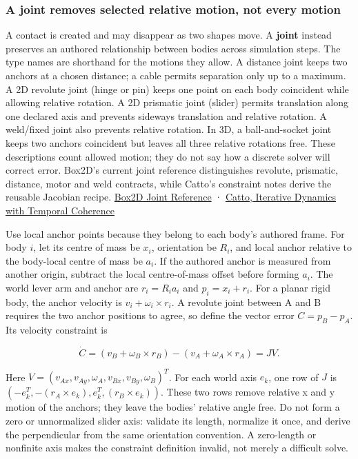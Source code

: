 \subsubsection{A joint removes selected relative motion, not every motion}\label{a-joint-removes-selected-relative-motion-not-every-motion}

A contact is created and may disappear as two shapes move. A \textbf{joint} instead preserves an authored relationship between bodies across simulation steps. The type names are shorthand for the motions they allow. A distance joint keeps two anchors at a chosen distance; a cable permits separation only up to a maximum. A 2D revolute joint (hinge or pin) keeps one point on each body coincident while allowing relative rotation. A 2D prismatic joint (slider) permits translation along one declared axis and prevents sideways translation and relative rotation. A weld/fixed joint also prevents relative rotation. In 3D, a ball-and-socket joint keeps two anchors coincident but leaves all three relative rotations free. These descriptions count allowed motion; they do not say how a discrete solver will correct error. Box2D's current joint reference distinguishes revolute, prismatic, distance, motor and weld contracts, while Catto's constraint notes derive the reusable Jacobian recipe. \href{https://box2d.org/documentation/group__joint.html}{Box2D Joint Reference} · \href{https://box2d.org/files/ErinCatto_IterativeDynamicsSlides_GDC2005.pdf}{Catto, Iterative Dynamics with Temporal Coherence}

Use local anchor points because they belong to each body's authored frame. For body \(i\), let its centre of mass be \(x_i\), orientation be \(R_i\), and local anchor relative to the body-local centre of mass be \(a_i\). If the authored anchor is measured from another origin, subtract the local centre-of-mass offset before forming \(a_i\). The world lever arm and anchor are \(r_i=R_i a_i\) and \(p_i=x_i+r_i\). For a planar rigid body, the anchor velocity is \(v_i+\omega_i\times r_i\). A revolute joint between A and B requires the two anchor positions to agree, so define the vector error \(C=p_B-p_A\). Its velocity constraint is

\[
\dot C=(v_B+\omega_B\times r_B)-(v_A+\omega_A\times r_A)=JV.
\]

Here \(V=(v_{Ax},v_{Ay},\omega_A,v_{Bx},v_{By},\omega_B)^T\). For each world axis \(e_k\), one row of \(J\) is \((-e_k^T,-(r_A\times e_k),e_k^T,(r_B\times e_k))\). These two rows remove relative x and y motion of the anchors; they leave the bodies' relative angle free. Do not form a zero or unnormalized slider axis: validate its length, normalize it once, and derive the perpendicular from the same orientation convention. A zero-length or nonfinite axis makes the constraint definition invalid, not merely a difficult solve.

